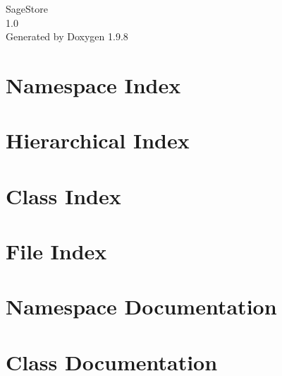 \documentclass[twoside]{book}
\newcommand{\+}{\discretionary{\mbox{\scriptsize$\hookleftarrow$}}{}{}}
\newcommand{\clearemptydoublepage}{%
    \newpage{\pagestyle{empty}\cleardoublepage}%
  }
\begin{document}
  \raggedbottom
    \hypersetup{pageanchor=false,
                bookmarksnumbered=true,
                pdfencoding=unicode
               }
  \begin{titlepage}
  \vspace*{7cm}
  \begin{center}%
  {\Large Sage\+Store}\\
  [1ex]\large 1.\+0 \\
  \vspace*{1cm}
  {\large Generated by Doxygen 1.9.8}\\
  \end{center}
  \end{titlepage}
  \clearemptydoublepage
  \tableofcontents
  \clearemptydoublepage
  \hypersetup{pageanchor=true}


\chapter{Namespace Index}

\chapter{Hierarchical Index}

\chapter{Class Index}

\chapter{File Index}

\chapter{Namespace Documentation}




\chapter{Class Documentation}















\end{document}
